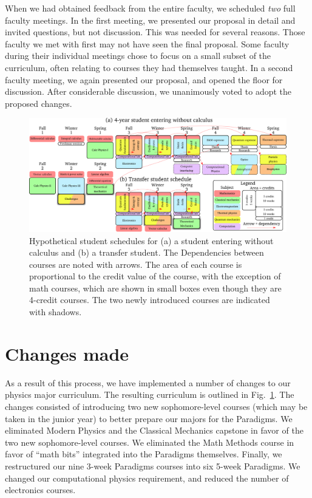 \documentclass[english,aps,pra,reprint,noshowpacs,superscriptaddress]{revtex4-1}
\begin{document}
When we had obtained feedback from the entire faculty, we scheduled
\emph{two} full faculty meetings.  In the first meeting, we presented
our proposal in detail and invited questions, but not discussion.
This was needed for several reasons.  Those faculty we met with first
may not have seen the final proposal.  Some faculty during their
individual meetings chose to focus on a small subset of the
curriculum, often relating to courses they had themselves taught.  In a
second faculty meeting, we again presented our proposal, and opened
the floor for discussion.  After considerable discussion, we
unanimously voted to adopt the proposed changes.

\newcommand\mathcourse[2]{\emph{#1}}
\newcommand\noted[2]{\textbf{#1} (#2)}
\newcommand\paradigm[1]{{\sc #1} (3)}
\newcommand\capstone[1]{#1 (3)}
\newcommand\onecredit[1]{#1 (1)}
\newcommand\threecredit[1]{#1 (3)}
\newcommand\fourcredit[1]{#1 (4)}

\begin{figure}
\includegraphics[width=\textwidth]{schedule}
\caption{Hypothetical student schedules for (a) a student entering
  without calculus and (b) a transfer student.  The Dependencies
  between courses are noted with arrows.  The area of each course is
  proportional to the credit value of the course, with the exception
  of math courses, which are shown in small boxes even though they are
  4-credit courses.  The two newly introduced courses are indicated
  with shadows.\label{fig:schedule}}
\end{figure}

\section{Changes made}
As a result of this process, we have implemented a number of changes
to our physics major curriculum.  The resulting curriculum is outlined
in Fig.~\ref{fig:schedule}.  The changes consisted of introducing two
new sophomore-level courses (which may be taken in the junior year) to
better prepare our majors for the Paradigms.  We eliminated Modern
Physics and the Classical Mechanics capstone in favor of the two new
sophomore-level courses.  We eliminated the Math Methods course in
favor of ``math bits'' integrated into the Paradigms themselves.
Finally, we restructured our nine 3-week Paradigms courses into six
5-week Paradigms.  We changed our computational physics requirement,
and reduced the number of electronics courses.
\end{document}
